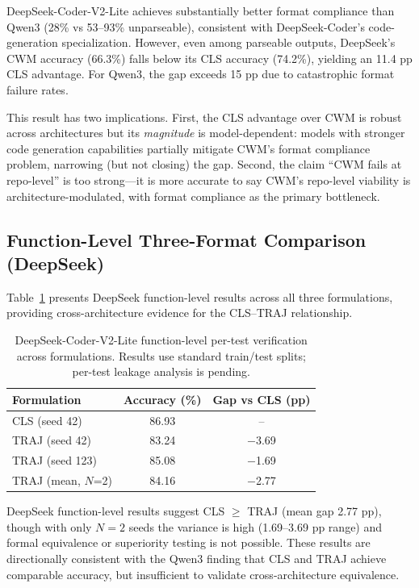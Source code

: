 \documentclass[11pt]{article}
\begin{document}
DeepSeek-Coder-V2-Lite achieves substantially better format compliance than Qwen3 (28\% vs 53--93\% unparseable), consistent with DeepSeek-Coder's code-generation specialization. However, even among parseable outputs, DeepSeek's CWM accuracy (66.3\%) falls below its CLS accuracy (74.2\%), yielding an 11.4 pp CLS advantage. For Qwen3, the gap exceeds 15 pp due to catastrophic format failure rates.

This result has two implications. First, the CLS advantage over CWM is robust across architectures but its \emph{magnitude} is model-dependent: models with stronger code generation capabilities partially mitigate CWM's format compliance problem, narrowing (but not closing) the gap. Second, the claim ``CWM fails at repo-level'' is too strong---it is more accurate to say CWM's repo-level viability is architecture-modulated, with format compliance as the primary bottleneck.

\subsection{Function-Level Three-Format Comparison (DeepSeek)}
\label{sec:func-deepseek}

Table~\ref{tab:func_deepseek} presents DeepSeek function-level results across all three formulations, providing cross-architecture evidence for the CLS--TRAJ relationship.

\begin{table}[t]
\centering
\caption{DeepSeek-Coder-V2-Lite function-level per-test verification across formulations. Results use standard train/test splits; per-test leakage analysis is pending.}
\label{tab:func_deepseek}
\begin{tabular}{lcc}
\toprule
Formulation & Accuracy (\%) & Gap vs CLS (pp) \\
\midrule
CLS (seed 42) & 86.93 & -- \\
TRAJ (seed 42) & 83.24 & $-$3.69 \\
TRAJ (seed 123) & 85.08 & $-$1.69 \\
TRAJ (mean, $N$=2) & 84.16 & $-$2.77 \\
\bottomrule
\end{tabular}
\end{table}

DeepSeek function-level results suggest CLS $\geq$ TRAJ (mean gap 2.77 pp), though with only $N=2$ seeds the variance is high (1.69--3.69 pp range) and formal equivalence or superiority testing is not possible. These results are directionally consistent with the Qwen3 finding that CLS and TRAJ achieve comparable accuracy, but insufficient to validate cross-architecture equivalence.
\end{document}
